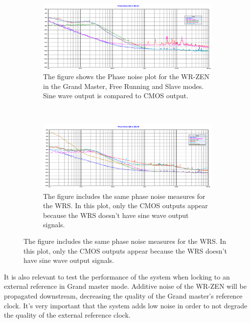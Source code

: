 \begin{figure}
    \centering
    \begin{subfigure}[t]{0.45\textwidth}
        \includegraphics[width=\textwidth]{../measures/img/zen_all}
        \caption[Phase noise plot of the WR-ZEN]{The figure shows the Phase noise plot for the WR-ZEN in the Grand Master, Free Running and Slave modes. Sine wave output is compared to CMOS output.}
        \label{fig:zen_pn_all}
    \end{subfigure}
    ~ %
    \begin{subfigure}[t]{0.45\textwidth}
         \includegraphics[width=\textwidth]{../measures/img/zen_vs_wrs}
         \caption[Phase noise plot of the WR-ZEN vs WRS]{The figure includes the same phase noise measures for the WRS. In this plot, only the CMOS outputs appear because the WRS doesn't have sine wave output signals.}
         \label{fig:zen_vs_wrs}
    \end{subfigure}
\end{figure}



It is also relevant to test the performance of the system when locking to an external reference in Grand master mode. Additive noise of the WR-ZEN will be propagated downstream, decreasing the quality of the Grand master's reference clock. It's very important that the system adds low noise in order to not degrade the quality of the external reference clock.

